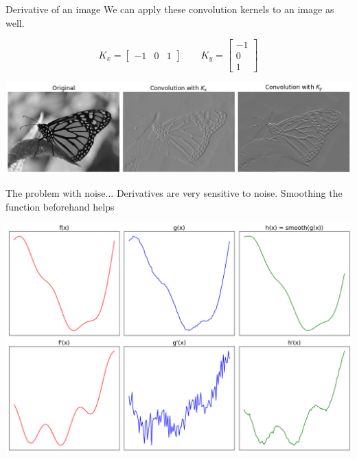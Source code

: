 \documentclass[9pt, aspectratio=169]{beamer}
\begin{document}
\begin{frame}
    {Derivative of an image}
    We can apply these convolution kernels to an image as well.

    $$K_x = \begin{bmatrix}-1&0&1\end{bmatrix} \qquad K_y = \begin{bmatrix}-1\\0\\1\end{bmatrix}$$

    \centering
    \includegraphics[width=.8\textwidth]{monarch_derivatives.png}
\end{frame}

\begin{frame}
    {The problem with noise...}
    Derivatives are very sensitive to noise. Smoothing the function beforehand helps

    \centering
    \includegraphics[width=.7\textwidth]{derivative_noise.png}
\end{frame}
\end{document}
